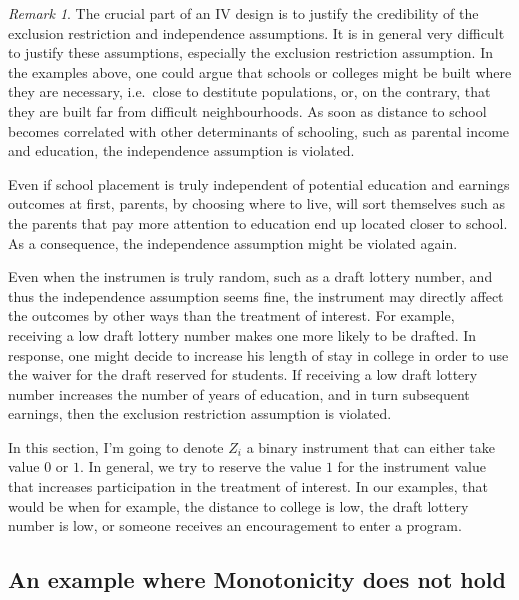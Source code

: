 \documentclass[
]{book}
\theoremstyle{definition}
\theoremstyle{definition}
\theoremstyle{definition}
\theoremstyle{definition}
\theoremstyle{remark}
\newtheorem*{remark}{Remark}
\begin{document}
\begin{remark}
\iffalse{} {Remark. } \fi{}The crucial part of an IV design is to justify the credibility of the exclusion restriction and independence assumptions.
It is in general very difficult to justify these assumptions, especially the exclusion restriction assumption.
In the examples above, one could argue that schools or colleges might be built where they are necessary, i.e.~close to destitute populations, or, on the contrary, that they are built far from difficult neighbourhoods.
As soon as distance to school becomes correlated with other determinants of schooling, such as parental income and education, the independence assumption is violated.

Even if school placement is truly independent of potential education and earnings outcomes at first, parents, by choosing where to live, will sort themselves such as the parents that pay more attention to education end up located closer to school.
As a consequence, the independence assumption might be violated again.

Even when the instrumen is truly random, such as a draft lottery number, and thus the independence assumption seems fine, the instrument may directly affect the outcomes by other ways than the treatment of interest.
For example, receiving a low draft lottery number makes one more likely to be drafted.
In response, one might decide to increase his length of stay in college in order to use the waiver for the draft reserved for students.
If receiving a low draft lottery number increases the number of years of education, and in turn subsequent earnings, then the exclusion restriction assumption is violated.
\end{remark}

In this section, I'm going to denote \(Z_i\) a binary instrument that can either take value \(0\) or \(1\).
In general, we try to reserve the value \(1\) for the instrument value that increases participation in the treatment of interest.
In our examples, that would be when for example, the distance to college is low, the draft lottery number is low, or someone receives an encouragement to enter a program.

\hypertarget{an-example-where-monotonicity-does-not-hold}{%
\subsection{An example where Monotonicity does not hold}\label{an-example-where-monotonicity-does-not-hold}}
\end{document}

